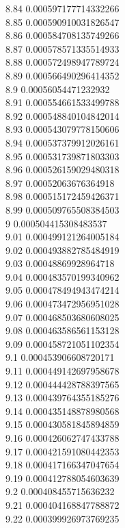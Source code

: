 {8.84	0.000597177714332266\\
8.85	0.000590910031826547\\
8.86	0.000584708135749266\\
8.87	0.000578571335514933\\
8.88	0.000572498947789724\\
8.89	0.000566490296414352\\
8.9	0.00056054471232932\\
8.91	0.000554661533499788\\
8.92	0.000548840104842014\\
8.93	0.000543079778150606\\
8.94	0.000537379912026161\\
8.95	0.000531739871803303\\
8.96	0.000526159029480318\\
8.97	0.00052063676364918\\
8.98	0.000515172459426371\\
8.99	0.000509765508384503\\
9	0.000504415308483537\\
9.01	0.000499121264005184\\
9.02	0.000493882785484919\\
9.03	0.00048869928964718\\
9.04	0.000483570199340962\\
9.05	0.000478494943474214\\
9.06	0.000473472956951028\\
9.07	0.000468503680608025\\
9.08	0.000463586561153128\\
9.09	0.000458721051102354\\
9.1	0.000453906608720171\\
9.11	0.000449142697958678\\
9.12	0.000444428788397565\\
9.13	0.000439764355185276\\
9.14	0.000435148878980568\\
9.15	0.000430581845894859\\
9.16	0.000426062747433788\\
9.17	0.000421591080442353\\
9.18	0.000417166347047654\\
9.19	0.000412788054603639\\
9.2	0.000408455715636232\\
9.21	0.000404168847788872\\
9.22	0.000399926973769235\\
}
